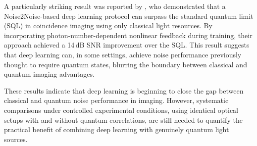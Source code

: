 A particularly striking result was reported by \citet{cai2023}, who demonstrated that a Noise2Noise-based deep learning protocol can surpass the standard quantum limit (SQL) in coincidence imaging using only classical light resources. By incorporating photon-number-dependent nonlinear feedback during training, their approach achieved a 14\,dB SNR improvement over the SQL. This result suggests that deep learning can, in some settings, achieve noise performance previously thought to require quantum states, blurring the boundary between classical and quantum imaging advantages.

These results indicate that deep learning is beginning to close the gap between classical and quantum noise performance in imaging. However, systematic comparisons under controlled experimental conditions, using identical optical setups with and without quantum correlations, are still needed to quantify the practical benefit of combining deep learning with genuinely quantum light sources.
